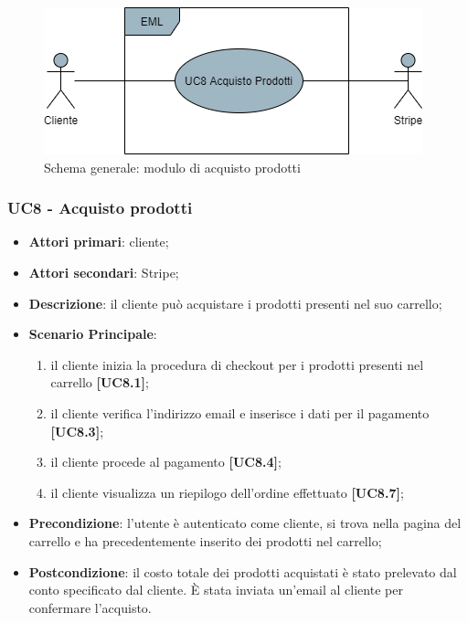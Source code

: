 \begin{figure}[H]
\centering
\includegraphics[scale=0.6]{res/UseCase/Immagini/AcquistoProdottiGenerale}
\caption{Schema generale: modulo di acquisto prodotti}
\end{figure}

\subsubsection{UC8 - Acquisto prodotti}
\begin{itemize}
\item \textbf{Attori primari}: cliente;
\item \textbf{Attori secondari}: Stripe;
\item \textbf{Descrizione}: il cliente può acquistare i prodotti presenti nel suo carrello;
\item \textbf{Scenario Principale}: 
\begin{enumerate}
	\item il cliente inizia la procedura di checkout per i prodotti presenti nel carrello \textbf{[UC8.1]};
	\item il cliente verifica l'indirizzo email e inserisce i dati per il pagamento \textbf{[UC8.3]};
	\item il cliente procede al pagamento \textbf{[UC8.4]};
	\item il cliente visualizza un riepilogo dell'ordine effettuato \textbf{[UC8.7]};
\end{enumerate}
\item \textbf{Precondizione}: l'utente è autenticato come cliente, si trova nella pagina del carrello e ha precedentemente inserito dei prodotti nel carrello;
\item \textbf{Postcondizione}: il costo totale dei prodotti acquistati è stato prelevato dal conto specificato dal cliente. È stata inviata un'email al cliente per confermare l'acquisto.
\end{itemize}

